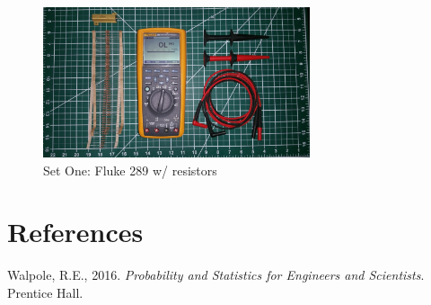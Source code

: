 \documentclass[10pt]{report}
\begin{document}
\begin{figure}[h!]
	\centering
	\includegraphics[width=0.7\textwidth]{process/dmm_resistors}
	\caption{Set One: Fluke 289 w/ resistors}
\end{figure}

\newpage
\section*{References}

Walpole, R.E., 2016. \textit{Probability and Statistics for Engineers and Scientists}. Prentice Hall.
\newline
\newline
\end{document}
